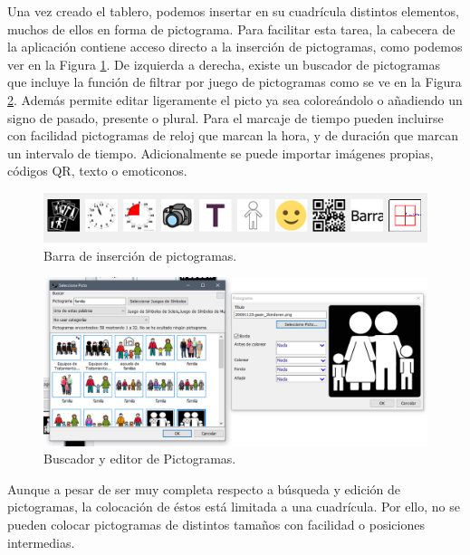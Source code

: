 Una vez creado el tablero, podemos insertar en su cuadrícula distintos elementos, muchos de ellos en forma de pictograma. Para facilitar esta tarea, la cabecera de la aplicación contiene acceso directo a la inserción de pictogramas, como podemos ver en la Figura \ref{fig:ribbon-pictoselector}. De izquierda a derecha, existe un buscador de pictogramas que incluye la función de filtrar por juego de pictogramas como se ve en la Figura \ref{fig:editor-y-buscador-de-pictoselector}. Además permite editar ligeramente el picto ya sea coloreándolo o añadiendo un signo de pasado, presente o plural. Para el marcaje de tiempo pueden incluirse con facilidad pictogramas de reloj que marcan la hora, y de duración que marcan un intervalo de tiempo. Adicionalmente se puede importar imágenes propias, códigos QR, texto o emoticonos.
\begin{figure}[h!]
	\centering
	\includegraphics[width=0.9\linewidth]{Imagenes/Bitmap/Ribbon Pictoselector}
	\caption{Barra de inserción de pictogramas.}
	\label{fig:ribbon-pictoselector}
\end{figure}

\begin{figure}[h!]
	\centering
	\includegraphics[width=1\linewidth]{Imagenes/Bitmap/Editor y buscador de pictoselector}
	\caption{Buscador y editor de Pictogramas.}
	\label{fig:editor-y-buscador-de-pictoselector}
\end{figure}

Aunque a pesar de ser muy completa respecto a búsqueda y edición de pictogramas, la colocación de éstos está limitada a una cuadrícula. Por ello, no se pueden colocar pictogramas de distintos tamaños con facilidad o posiciones intermedias.

